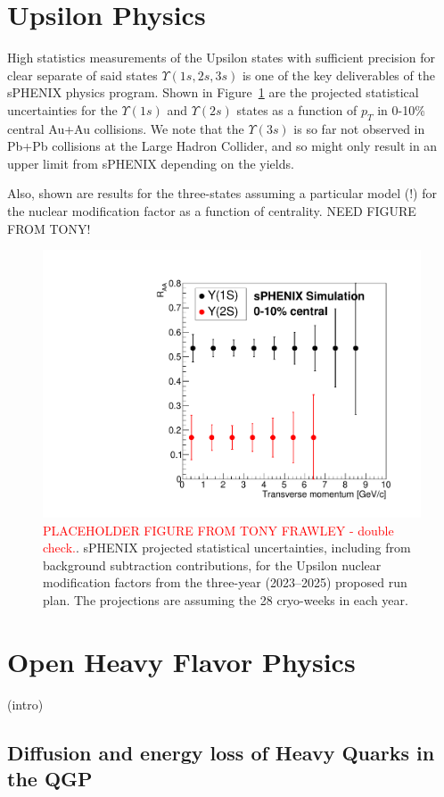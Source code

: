 \section{Upsilon Physics}
\label{sec:upsilon}

High statistics measurements of the Upsilon states with sufficient precision for clear separate of said states $\Upsilon(1s,2s,3s)$ is one of the key deliverables of the sPHENIX physics program.  Shown in Figure~\ref{fig:upsilon3years} are the projected statistical uncertainties for the $\Upsilon(1s)$ and $\Upsilon(2s)$ states as a function of $p_{T}$ in 0-10\% central Au+Au collisions.   We note that the $\Upsilon(3s)$ is so far not observed in Pb+Pb collisions at the Large Hadron Collider, and so might only result in an upper limit from sPHENIX depending on the yields.   

Also, shown are results for the three-states assuming a particular model (!) for the nuclear modification factor as a function of centrality.   NEED FIGURE FROM TONY!

\begin{figure}[h]
    \centering
    \includegraphics[width=0.55\linewidth]{figs/BUP_Upsilon_RAA_3yr_28wks.pdf}
    \caption{{\textcolor{red}{PLACEHOLDER FIGURE FROM TONY FRAWLEY - double check.}}. sPHENIX projected statistical uncertainties, including from background subtraction contributions, for the Upsilon nuclear modification factors from the three-year (2023--2025) proposed run plan.   The projections are assuming the 28 cryo-weeks in each year.
    \label{fig:upsilon3years}}
\end{figure}

\section{Open Heavy Flavor Physics}
\label{sec:HF}

(intro)

\subsection{Diffusion and energy loss of Heavy Quarks in the QGP}



